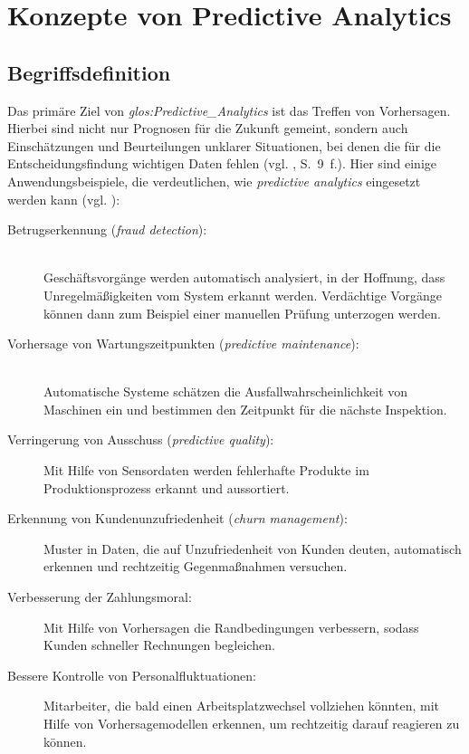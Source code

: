 \chapter{Konzepte von Predictive Analytics}
\label{part:Konzepte_PA}

\section{Begriffsdefinition}

Das primäre Ziel von \emph{\gls{glos:Predictive_Analytics}} ist das Treffen von
Vorhersagen.
Hierbei sind nicht nur Prognosen für die Zukunft gemeint, sondern
auch Einschätzungen und Beurteilungen unklarer Situationen, bei denen die für
die Entscheidungsfindung wichtigen Daten fehlen (vgl. \cite{Dinov}, S.~9~f.).
Hier sind einige Anwendungsbeispiele, die verdeutlichen, wie \emph{predictive
analytics} eingesetzt werden kann (vgl. \cite{Schmitz}):
\begin{description}
\item[Betrugserkennung (\emph{fraud detection}):] \hfill \\
Geschäftsvorgänge werden automatisch analysiert, in der Hoffnung, dass
Unregelmäßigkeiten vom System erkannt werden. Verdächtige Vorgänge können dann
zum Beispiel einer manuellen Prüfung unterzogen werden.


\item[Vorhersage von Wartungszeitpunkten (\emph{predictive
  maintenance}):] \hfill \\
Automatische Systeme schätzen die Ausfallwahrscheinlichkeit von Maschinen ein
und bestimmen den Zeitpunkt für die nächste Inspektion.
\item[Verringerung von Ausschuss (\emph{predictive quality}):]
Mit Hilfe von Sensordaten werden fehlerhafte Produkte im Produktionsprozess
erkannt und aussortiert.
\item[Erkennung von Kundenunzufriedenheit (\emph{churn management}):]
Muster in Daten, die auf Unzufriedenheit von Kunden deuten, automatisch erkennen
und rechtzeitig Gegenmaßnahmen versuchen.
\item[Verbesserung der Zahlungsmoral:]
Mit Hilfe von Vorhersagen die Randbedingungen verbessern, sodass Kunden
schneller Rechnungen begleichen.
\item[Bessere Kontrolle von Personalfluktuationen:]
Mitarbeiter, die bald einen Arbeitsplatzwechsel vollziehen könnten, mit Hilfe
von Vorhersagemodellen erkennen, um rechtzeitig darauf reagieren zu können.
\end{description}
